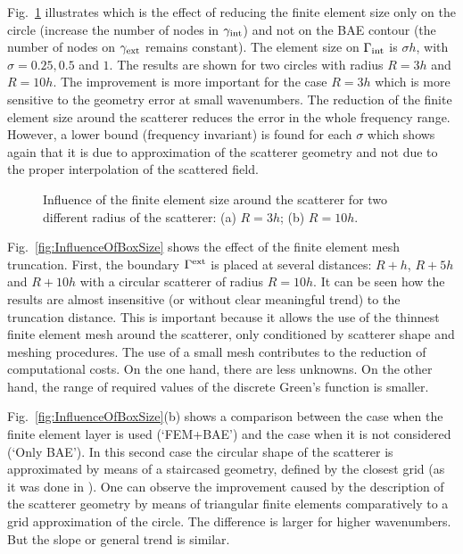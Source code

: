 \documentclass[12pt]{article}
\newcommand{\rin}{{\rm int}}
\newcommand{\rex}{{\rm ext}}
\newcommand{\fref}[1]{Fig.~\ref{#1}}
\begin{document}
\fref{fig:InfluenceOfFemSize} illustrates which is the effect of reducing the finite element size only on the circle (increase the number of nodes in $\gamma_\rin$) and not on the BAE contour (the number of nodes on $\gamma_\rex$ remains constant). The element size on $\Gamma_\rin$ is $\sigma h$, with $\sigma = 0.25, 0.5$ and $1$. The results are shown for two circles with radius $R = 3h$ and $R = 10h$. The improvement is more important for the case $R = 3h$ which is more sensitive to the geometry error at small wavenumbers. The reduction of the finite element size around the scatterer reduces the error in the whole frequency range. However, a lower bound (frequency invariant) is found for each $\sigma$ which shows again that it is due to approximation of the scatterer geometry and not due to the proper interpolation of the scattered field.

\begin{figure}[ht]
 
\caption{Influence of the finite element size around the scatterer for two different radius of the scatterer: (a) $R = 3h$; (b) $R = 10h$.}
\label{fig:InfluenceOfFemSize}
\end{figure}

\fref{fig:InfluenceOfBoxSize} shows the effect of the finite element mesh truncation. First, the boundary $\Gamma^{\rex}$ is placed at several distances: $R+h$, $R+5h$ and $R+10h$ with a circular scatterer of radius $R = 10h$. It can be seen how the results are almost insensitive (or without clear meaningful trend) to the truncation distance. This is important because it allows the use of the thinnest finite element mesh around the scatterer, only conditioned by scatterer shape and meshing procedures. The use of a small mesh contributes to the reduction of computational costs. On the one hand, there are less unknowns. On the other hand, the range of required values of the discrete Green's function is smaller.

\fref{fig:InfluenceOfBoxSize}(b) shows a comparison between the case when the finite element layer is used (`FEM+BAE') and the case when it is not considered (`Only BAE'). In this second case the circular shape of the scatterer is approximated by means of a staircased geometry, defined by the closest grid (as it was done in \cite{poblet-PVS:2015}). 
One can observe the improvement caused by the description of the scatterer geometry by means of triangular finite elements comparatively to a grid approximation of the circle. The difference is larger for higher wavenumbers. But the slope or general trend is similar.
\end{document}
